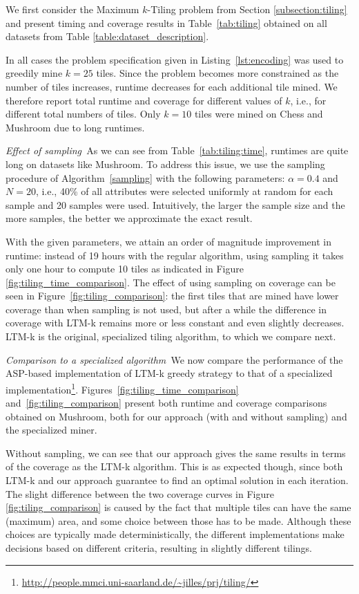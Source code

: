 \label{subsec:experiments_tiling}

We first consider the Maximum $k$-Tiling problem from Section \ref{subsection:tiling} and present timing and coverage results in Table~\ref{tab:tiling} obtained on all datasets from Table \ref{table:dataset_description}.

In all cases the problem specification given in Listing~\ref{lst:encoding} was used to greedily mine $k=25$ tiles. Since the problem becomes more constrained as the number of tiles increases, runtime decreases for each additional tile mined. We therefore report total runtime and coverage for different values of $k$, i.e., for different total numbers of tiles. Only $k=10$ tiles were mined on Chess and Mushroom due to long runtimes.


\textit{Effect of sampling~}As we can see from Table~\ref{tab:tiling:time}, runtimes are quite long on datasets like Mushroom. To address this issue, we use the sampling procedure of Algorithm~\ref{sampling} with the following parameters: $\alpha = 0.4$ and $N = 20$, i.e., 40\% of all attributes were selected uniformly at random for each sample and 20 samples were used. Intuitively, the larger the sample size and the more samples, the better we approximate the exact result.

With the given parameters, we attain an order of magnitude improvement in runtime: instead of 19 hours with the regular algorithm, using sampling it takes only one hour to compute 10 tiles as indicated in Figure \ref{fig:tiling_time_comparison}. The effect of using sampling on coverage can be seen in Figure~\ref{fig:tiling_comparison}: the first tiles that are mined have lower coverage than when sampling is not used, but after a while the difference in coverage with LTM-k remains more or less constant and even slightly decreases. LTM-k is the original, specialized tiling algorithm, to which we compare next.


\textit{Comparison to a specialized algorithm~}We now compare the performance of the ASP-based implementation of LTM-k greedy strategy to that of a specialized implementation\footnote{\url{http://people.mmci.uni-saarland.de/~jilles/prj/tiling/}}. Figures~\ref{fig:tiling_time_comparison} and~\ref{fig:tiling_comparison} present both runtime and coverage comparisons obtained on Mushroom, both for our approach (with and without sampling) and the specialized miner. 

Without sampling, we can see that our approach gives the same results in terms of the coverage as the LTM-k algorithm. This is as expected though, since both LTM-k and our approach guarantee to find an optimal solution in each iteration. \changesb The slight difference between the two coverage curves in Figure \ref{fig:tiling_comparison} is caused by the fact that multiple tiles can have the same (maximum) area, and some choice between those has to be made. Although these choices are typically made deterministically, the different implementations make decisions based on different criteria, resulting in slightly different tilings. \changese

